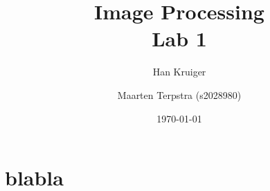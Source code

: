 \documentclass[a4paper]{article}
\title{\textsf{Image Processing \\ Lab 1}}
\author{Han Kruiger \and Maarten Terpstra (s2028980)}
\date{\today}
\newcounter{exerciseCount}
\newcommand{\exercise}[1]{\addtocounter{exerciseCount}{1} \noindent \medskip {\large \textsf{\textbf{Exercise \arabic{exerciseCount} \--- #1}}} \par}
\begin{document}
\maketitle



\section{blabla}
% 
% 
% 
% 
\end{document}
